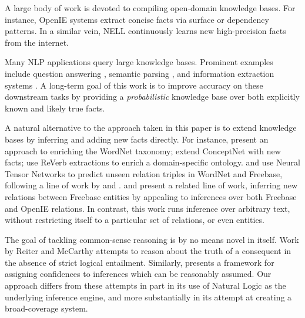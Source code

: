 A large body of work is devoted to compiling open-domain knowledge
  bases.
For instance, OpenIE systems
  \cite{key:2007yates-textrunner,key:2011fader-reverb,key:2012mausam-ollie}
  extract concise facts via surface or dependency patterns.
In a similar vein, NELL \cite{key:2010carlson-nell,key:2013gardnerpra-nell}
  continuously learns new high-precision facts from the internet.

Many NLP applications query large knowledge bases.
Prominent examples include
  question answering
    \cite{key:2001voorhees-trec},
  semantic parsing
    \cite{key:1996zelle-semantics,key:2007zettlemoyer-semantics,key:2013kwiatkowski-semantics,key:2014berant-semantics},
  and information extraction systems
    \cite{key:2011hoffman-kbp,key:2012surdeanu-mimlre}.
A long-term goal of this work is to improve accuracy on these
  downstream tasks by providing a \textit{probabilistic} knowledge base
  over both explicitly known and likely true facts.

A natural alternative to the approach taken in this paper is to
  extend knowledge bases by inferring and adding new facts directly.
For instance,
   present an approach to enriching 
    the WordNet taxonomy;
   extend ConceptNet with new facts;
   use ReVerb extractions to 
    enrich a domain-specific ontology.
 and 
  use Neural Tensor Networks to predict unseen relation triples in
  WordNet and Freebase, following a line of work by
   and
  .
 and 
  present a related line of work, inferring new relations between
  Freebase entities by appealing to inferences over both Freebase and
  OpenIE relations.
In contrast, this work runs inference over arbitrary text, without 
  restricting itself to a particular set of relations, or even entities.


The goal of tackling common-sense reasoning is by no means novel in
  itself.
Work by Reiter and McCarthy \cite{key:1980reiter-logic,key:1980mccarthy-circumscription}
  attempts to reason about the truth of a consequent
  in the absence of strict logical entailment.
Similarly,  presents a framework for
  assigning confidences to inferences which can be reasonably assumed.
Our approach differs from these attempts in part in its use of Natural Logic
  as the underlying inference engine, and more substantially in its
  attempt at creating a broad-coverage system.

